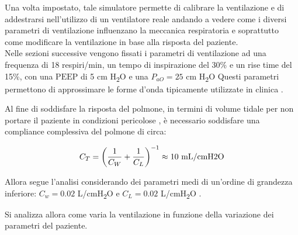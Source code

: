 Una volta impostato, tale simulatore permette di calibrare la ventilazione e di addestrarsi nell'utilizzo di un ventilatore reale andando a vedere come i diversi parametri di ventilazione influenzano la meccanica respiratoria e soprattutto come modificare la ventilazione in base alla risposta del paziente.
\\

Nelle sezioni successive vengono fissati i parametri di ventilazione \cite{truwit_modes_2011} ad una frequenza di 18 respiri/min, un tempo di inspirazione del 30\% e un rise time del 15\%, con una $\mathrm{PEEP}$ di 5 cm H\textsubscript{2}O e una $P_{aO}=25$  cm H\textsubscript{2}O Questi parametri permettono di approssimare le forme d'onda tipicamente utilizzate in clinica \cite{al-naggar_modelling_2015}. 

Al fine di soddisfare la risposta del polmone, in termini di volume tidale per non portare il paziente in condizioni pericolose \cite{ventilation_2000}, è necessario soddisfare una compliance complessiva del polmone di circa:

\begin{equation}
	C_{T}=\left({1 \over C_{W}}+{1 \over C_{L}}\right)^{-1}\approx 10 \text{ mL/cmH2O}
\end{equation}

Allora segue l'analisi considerando dei parametri medi di un'ordine di grandezza inferiore: $C_w=0.02$ L/cmH\textsubscript{2}O e $C_L=0.02$ L/cmH\textsubscript{2}O .

Si analizza allora come varia la ventilazione in funzione della variazione dei parametri del paziente. 

